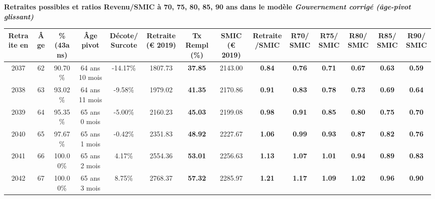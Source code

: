  \vspace{0.1cm} 
{\bf \noindent Retraites possibles et ratios Revenu/SMIC à 70, 75, 80, 85, 90 ans dans le modèle \emph{Gouvernement corrigé (âge-pivot glissant)}}  
 
\begin{adjustbox}{max width=\textwidth} 
\begin{tabular}[htb]{|c|c||c|c|c||c|c||c|c||c|c|c|c|c|} 
\hline 
 Retraite en &  Âge &  \%(43ans) &  Âge pivot &  Décote/Surcote &  Retraite (\euro{} 2019) &  Tx Rempl(\%) &  SMIC (\euro{} 2019) &  Retraite/SMIC &  R70/SMIC &  R75/SMIC &  R80/SMIC &  R85/SMIC &  R90/SMIC \\ 
\hline \hline 
 2037 &  62 &  90.70\% &  64 ans 10 mois &  -14.17\% &  1807.73 &  {\bf 37.85} &  2143.00 &  {\bf {\color{red} 0.84}} &  {\bf {\color{red} 0.76}} &  {\bf {\color{red} 0.71}} &  {\bf {\color{red} 0.67}} &  {\bf {\color{red} 0.63}} &  {\bf {\color{red} 0.59}} \\ 
\hline 
 2038 &  63 &  93.02\% &  64 ans 11 mois &  -9.58\% &  1979.02 &  {\bf 41.35} &  2170.86 &  {\bf {\color{red} 0.91}} &  {\bf {\color{red} 0.83}} &  {\bf {\color{red} 0.78}} &  {\bf {\color{red} 0.73}} &  {\bf {\color{red} 0.69}} &  {\bf {\color{red} 0.64}} \\ 
\hline 
 2039 &  64 &  95.35\% &  65 ans 0 mois &  -5.00\% &  2160.23 &  {\bf 45.03} &  2199.08 &  {\bf {\color{red} 0.98}} &  {\bf {\color{red} 0.91}} &  {\bf {\color{red} 0.85}} &  {\bf {\color{red} 0.80}} &  {\bf {\color{red} 0.75}} &  {\bf {\color{red} 0.70}} \\ 
\hline 
 2040 &  65 &  97.67\% &  65 ans 1 mois &  -0.42\% &  2351.83 &  {\bf 48.92} &  2227.67 &  {\bf 1.06} &  {\bf {\color{red} 0.99}} &  {\bf {\color{red} 0.93}} &  {\bf {\color{red} 0.87}} &  {\bf {\color{red} 0.82}} &  {\bf {\color{red} 0.76}} \\ 
\hline 
 2041 &  66 &  100.00\% &  65 ans 2 mois &  4.17\% &  2554.36 &  {\bf 53.01} &  2256.63 &  {\bf 1.13} &  {\bf 1.07} &  {\bf 1.01} &  {\bf {\color{red} 0.94}} &  {\bf {\color{red} 0.89}} &  {\bf {\color{red} 0.83}} \\ 
\hline 
 2042 &  67 &  100.00\% &  65 ans 3 mois &  8.75\% &  2768.37 &  {\bf 57.32} &  2285.97 &  {\bf 1.21} &  {\bf 1.17} &  {\bf 1.09} &  {\bf 1.02} &  {\bf {\color{red} 0.96}} &  {\bf {\color{red} 0.90}} \\ 
\hline 
\hline 
\end{tabular} 
\end{adjustbox} 
 
